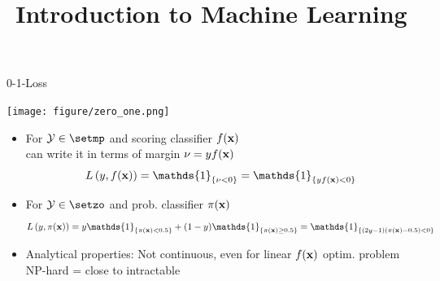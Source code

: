 \documentclass[11pt,compress,t,notes=noshow, xcolor=table]{beamer}
\title{Introduction to Machine Learning}
\begin{document}
    

\begin{vbframe}{0-1-Loss}

{
\begin{center}
\texttt{[image: figure/zero\_one.png]}
\end{center}
}

\vfill

\begin{itemize}
\item For $\Yspace \in \setmp$ and scoring classifier $f(\mathbf{x})$\\
can write it in terms of margin $\nu = yf(\mathbf{x})$
$$
\Lxy = \mathds{1}_{\{\nu < 0\}} = \mathds{1}_{\{y\fx < 0\}}
$$
\item For $\Yspace \in \setzo$ and prob. classifier $\pi(\mathbf{x})$
$$
\Lpixy = y \mathds{1}_{\{\pix < 0.5\}} + (1-y) \mathds{1}_{\{\pix \geq 0.5\}} = \mathds{1}_{\{(2y-1)(\pix - 0.5) < 0 \}} 
$$
\item Analytical properties:  Not continuous, even for linear $f(\mathbf{x})$ optim. problem NP-hard = close to intractable 
\end{itemize}

\end{vbframe}
\end{document}
